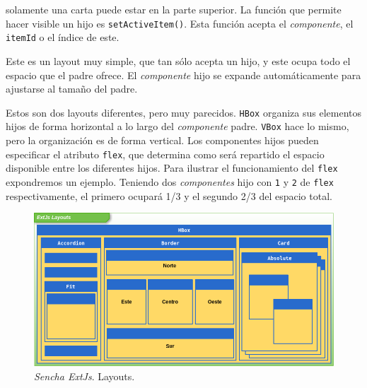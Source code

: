\begin{description}[style=unboxed,leftmargin=0cm,labelwidth=1cm]
			  solamente una carta puede estar en la parte superior. La función que permite hacer visible un hijo es \texttt{setActiveItem()}.
			  Esta función acepta el \emph{componente}, el \texttt{itemId} o el índice de este.
			\item[\texttt{Fit}] Este es un layout muy simple, que tan sólo acepta un hijo, y este ocupa todo el espacio que el padre ofrece.
			  El \emph{componente} hijo se expande automáticamente para ajustarse al tamaño del padre.
			\item[\texttt{HBox y VBox}] Estos son dos layouts diferentes, pero muy parecidos. \texttt{HBox} organiza sus elementos hijos
			  de forma horizontal a lo largo del \emph{componente} padre. \texttt{VBox} hace lo mismo, pero la organización es de forma
			  vertical. Los componentes hijos pueden especificar el atributo \texttt{flex}, que determina como será repartido el
			  espacio disponible entre los diferentes hijos. Para ilustrar el funcionamiento del \texttt{flex} expondremos un ejemplo.
			  Teniendo dos \emph{componentes} hijo con \texttt{1} y \texttt{2} de \texttt{flex} respectivamente, el primero ocupará 1/3 y
			  el segundo 2/3 del espacio total.
		\end{description}
		\begin{figure}[h]
			\centering
			\includegraphics[keepaspectratio, width=1\textwidth]{./img/layouts.png}
			\caption{\emph{Sencha ExtJs}. Layouts.}   
			\label{fig:layouts}
		\end{figure}

